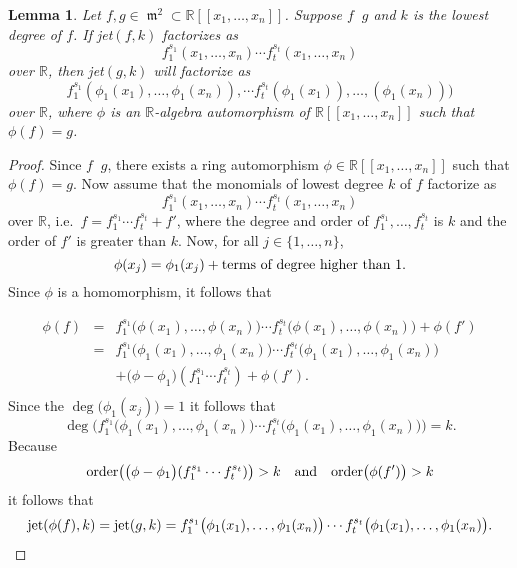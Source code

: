 \documentclass{amsproc}
\DeclareMathOperator{\requiv}{\overset{r}{\sim}}
\DeclareMathOperator{\m}{\mathfrak{m}}
\begin{document}
\newtheorem{kjet}{Lemma}[section]
\begin{kjet}\label{kjet}
Let $f,g\in \m^2\subset\mathbb R[[x_1,\ldots,x_n]]$. Suppose $f\requiv g$
and $k$
is the lowest degree of $f$. If jet$(f,k)$ factorizes as
\[f_1^{s_1}(x_1,\ldots,x_n)\cdots f_t^{s_t}(x_1,\ldots,x_n)\]
over $\mathbb R$, then jet$(g,k)$ will factorize
as \[f_1^{s_1} (\phi_1(x_1),\ldots,\phi_1(x_n)),\cdots
f_t^{s_t}(\phi_1(x_1)),\ldots,(\phi_1(x_n)))\] over $\mathbb R$, where $\phi$
is an $\mathbb R$-algebra automorphism of $\mathbb R[[x_1,\ldots,x_n]]$
such that $\phi(f)=g$.
\end{kjet}
\begin{proof}
Since $f\requiv g$, there exists a ring automorphism $\phi\in\mathbb
R[[x_1,\ldots,x_n]]$ such that  $\phi(f)=g$. Now
assume that the monomials of lowest degree $k$ of $f$ factorize
as \[f_1^{s_1}(x_1,\ldots,x_n)\cdots f_t^{s_t}(x_1,\ldots,x_n)\] over
$\mathbb R$, i.e.~$f=f_1^{s_1}\cdots f_t^{s_t}+f'$, where the degree and order of
$f_1^{s_1},\ldots,f_t^{s_t}$ is $k$ and the order of $f'$ is greater than $k$.
Now, for all $j\in\{1,\ldots,n\}$, \[\phi(x_j)=\phi_1(x_j)+\textnormal{terms of
degree higher than $1$}.\] Since $\phi$ is a homomorphism, it follows that

\begin{eqnarray*}
\phi(f)&=&f_1^{s_1}\big(\phi(x_1),\ldots,\phi(x_n)\big)\cdots
f_t^{s_t}\big(\phi(x_1),\ldots,\phi(x_n)\big)+\phi(f')\\&=&f_1^{s_1}\big(\phi_1(x_1),\ldots,\phi_1(x_n)\big)\cdots
f_t^{s_t}\big(\phi_1(x_1),\ldots,\phi_1(x_n)\big)\\&&+\big(\phi-\phi_1\big)(f_1^{s_1}\cdots f_t^{s_t})+\phi(f').\\\end{eqnarray*}
Since the $\deg\big(\phi_1(x_j))=1$ it follows that
\[\deg\big(f_1^{s_1}\big(\phi_1(x_1),\ldots,\phi_1(x_n)\big)\cdots
f_t^{s_t}\big(\phi_1(x_1),\ldots,\phi_1(x_n)\big)\big)=k.\] Because
\[\textnormal{order}\big(\big(\phi-\phi_1\big)(f_1^{s_1}\cdots f_t^{s_t})\big)>k\quad\textnormal{and}\quad\textnormal{order}\big(\phi(f')\big)>k\]
it follows that
\begin{eqnarray*}
\textnormal{jet}(\phi(f),k)=\textnormal{jet}(g,k)=f_1^{s_1}\big(\phi_1(x_1),\ldots,\phi_1(x_n)\big)\cdots
f_t^{s_t}\big(\phi_1(x_1),\ldots,\phi_1(x_n)\big).
\end{eqnarray*}
\end{proof}
\end{document}
